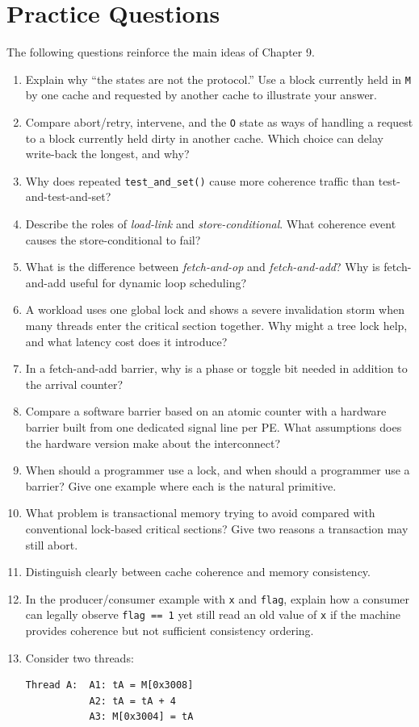 \section{Practice Questions}\label{sec:ch9-practice}
The following questions reinforce the main ideas of Chapter 9.
\begin{enumerate}
    \item Explain why ``the states are not the protocol.'' Use a block currently held in \texttt{M} by one cache and requested by another cache to illustrate your answer.
    \item Compare abort/retry, intervene, and the \texttt{O} state as ways of handling a request to a block currently held dirty in another cache.
    Which choice can delay write-back the longest, and why?
    \item Why does repeated \texttt{test\_and\_set()} cause more coherence traffic than test-and-test-and-set?
    \item Describe the roles of \textit{load-link} and \textit{store-conditional}.
    What coherence event causes the store-conditional to fail?
    \item What is the difference between \textit{fetch-and-op} and \textit{fetch-and-add}? Why is fetch-and-add useful for dynamic loop scheduling?
    \item A workload uses one global lock and shows a severe invalidation storm when many threads enter the critical section together.
    Why might a tree lock help, and what latency cost does it introduce?
    \item In a fetch-and-add barrier, why is a phase or toggle bit needed in addition to the arrival counter?
    \item Compare a software barrier based on an atomic counter with a hardware barrier built from one dedicated signal line per PE. What assumptions does the hardware version make about the interconnect?
    \item When should a programmer use a lock, and when should a programmer use a barrier?
    Give one example where each is the natural primitive.
    \item What problem is transactional memory trying to avoid compared with conventional lock-based critical sections?
    Give two reasons a transaction may still abort.
    \item Distinguish clearly between cache coherence and memory consistency.
    \item In the producer/consumer example with \texttt{x} and \texttt{flag}, explain how a consumer can legally observe \texttt{flag == 1} yet still read an old value of \texttt{x} if the machine provides coherence but not sufficient consistency ordering.
    \item Consider two threads:
    \begin{verbatim}
Thread A:  A1: tA = M[0x3008]
           A2: tA = tA + 4
           A3: M[0x3004] = tA


\end{verbatim}
\end{enumerate}
